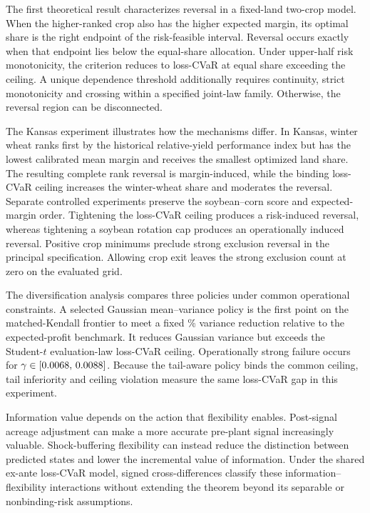 The first theoretical result characterizes reversal in a fixed-land two-crop
model. When the higher-ranked crop also has the higher expected margin, its
optimal share is the right endpoint of the risk-feasible interval. Reversal
occurs exactly when that endpoint lies below the equal-share allocation. Under
upper-half risk monotonicity, the criterion reduces to loss-CVaR at equal share
exceeding the ceiling. A unique dependence threshold additionally requires
continuity, strict monotonicity and crossing within a specified joint-law
family. Otherwise, the reversal region can be disconnected.

The Kansas experiment illustrates how the mechanisms differ. In Kansas,
winter wheat ranks first by the historical relative-yield performance index but has the
lowest calibrated mean margin and receives the smallest optimized land share.
The resulting complete rank reversal is margin-induced, while the binding
loss-CVaR ceiling increases the winter-wheat share and moderates the reversal.
Separate controlled experiments preserve the soybean--corn score and
expected-margin order. Tightening the loss-CVaR ceiling produces a
risk-induced reversal, whereas tightening a soybean rotation cap produces an
operationally induced reversal. Positive crop minimums preclude strong
exclusion reversal in the principal specification. Allowing crop exit leaves
the strong exclusion count at zero on the evaluated grid.

The diversification analysis compares three policies under common operational
constraints. A selected Gaussian mean--variance policy is the first point on
the matched-Kendall frontier to meet a fixed \DiversificationTarget\% variance
reduction relative to the expected-profit benchmark. It reduces Gaussian
variance but exceeds the Student-\(t\) evaluation-law loss-CVaR ceiling.
Operationally strong failure occurs for
\(\gamma\in[0.0068,\,0.0088]\). Because the tail-aware
policy binds the common ceiling, tail inferiority and ceiling violation
measure the same loss-CVaR gap in this experiment.

Information value depends on the action that flexibility enables. Post-signal
acreage adjustment can make a more accurate pre-plant signal increasingly
valuable. Shock-buffering flexibility can instead reduce the distinction
between predicted states and lower the incremental value of information.
Under the shared ex-ante loss-CVaR model, signed cross-differences classify
these information--flexibility interactions without extending the theorem
beyond its separable or nonbinding-risk assumptions.

